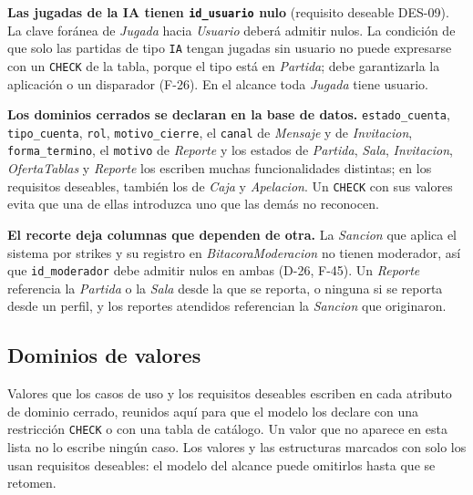 \begin{flujo}
  \item \textbf{Las jugadas de la IA tienen \texttt{id\_\allowbreak{}usuario} nulo} (requisito deseable \mbox{DES-09}). La clave foránea de \textit{Jugada} hacia \textit{Usuario} deberá admitir nulos. La condición de que solo las partidas de tipo \texttt{IA} tengan jugadas sin usuario no puede expresarse con un \texttt{CHECK} de la tabla, porque el tipo está en \textit{Partida}; debe garantizarla la aplicación o un disparador (\mbox{F-26}). En el alcance toda \textit{Jugada} tiene usuario.
  \item \textbf{Los dominios cerrados se declaran en la base de datos.} \texttt{estado\_\allowbreak{}cuenta}, \texttt{tipo\_\allowbreak{}cuenta}, \texttt{rol}, \texttt{motivo\_\allowbreak{}cierre}, el \texttt{canal} de \textit{Mensaje} y de \textit{Invitacion}, \texttt{forma\_\allowbreak{}termino}, el \texttt{motivo} de \textit{Reporte} y los estados de \textit{Partida}, \textit{Sala}, \textit{Invitacion}, \textit{OfertaTablas} y \textit{Reporte} los escriben muchas funcionalidades distintas; en los requisitos deseables, también los de \textit{Caja} y \textit{Apelacion}. Un \texttt{CHECK} con sus valores evita que una de ellas introduzca uno que las demás no reconocen.
  \item \textbf{El recorte deja columnas que dependen de otra.} La \textit{Sancion} que aplica el sistema por strikes y su registro en \textit{BitacoraModeracion} no tienen moderador, así que \texttt{id\_\allowbreak{}moderador} debe admitir nulos en ambas (\mbox{D-26}, \mbox{F-45}). Un \textit{Reporte} referencia la \textit{Partida} o la \textit{Sala} desde la que se reporta, o ninguna si se reporta desde un perfil, y los reportes atendidos referencian la \textit{Sancion} que originaron.
\end{flujo}
\subsection*{Dominios de valores}

Valores que los casos de uso y los requisitos deseables escriben en cada atributo de dominio cerrado, reunidos aquí para que el modelo los declare con una restricción \texttt{CHECK} o con una tabla de catálogo. Un valor que no aparece en esta lista no lo escribe ningún caso. Los valores y las estructuras marcados con \textdagger{} solo los usan requisitos deseables: el modelo del alcance puede omitirlos hasta que se retomen.

